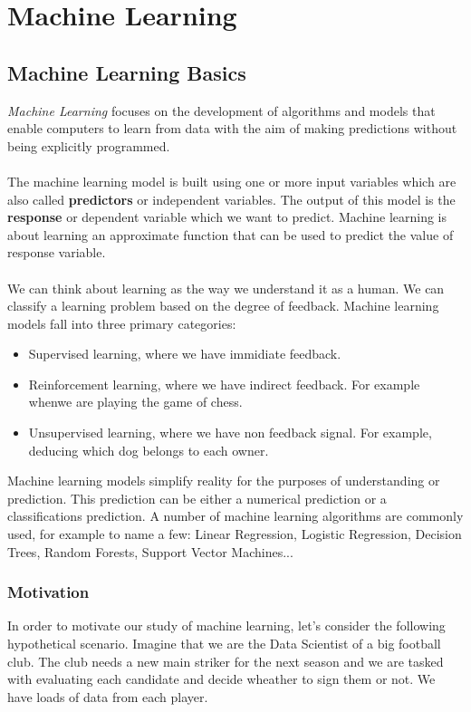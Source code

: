 \documentclass[../main.tex]{subfiles}
\begin{document}
	\chapter{Machine Learning} \label{ch:machine}
	

	\section{Machine Learning Basics}
	\noindent 
	
	\noindent  \textit{Machine Learning} focuses on the development of algorithms and models that enable computers to learn from data with the aim of making predictions without being explicitly programmed. \\ \\ 
	The machine learning model is built using one or more input variables which are also called \textbf{predictors} or independent variables. The output of this model is the \textbf{response} or dependent variable which we want to predict. Machine learning is about learning an approximate function that can be used to predict the value of response variable.\\ \\
	We can think about learning as the way we understand it as a human. We can classify a learning problem based on the degree of feedback. Machine learning models fall into three primary categories:
	\begin{itemize}
		\item Supervised learning, where we have immidiate feedback.
		\item Reinforcement learning, where we have indirect feedback. For example whenwe are playing the game of chess.
		\item Unsupervised learning, where we have non feedback signal. For example, deducing which dog belongs to each owner.
	\end{itemize}
	Machine learning models simplify reality for the purposes of understanding or prediction. This prediction can be either a numerical prediction or a classifications prediction. A number of machine learning algorithms are commonly used, for example to name a few: Linear Regression, Logistic Regression, Decision Trees, Random Forests, Support Vector Machines...
	
	
	\subsection{Motivation }
	\noindent In order to motivate our study of machine learning, let's consider the following hypothetical scenario.  Imagine that we are the Data Scientist of a big football club. The club needs a new main striker for the next season and we are tasked with evaluating each candidate and decide wheather to sign them or not. We have loads of data from each player. \\ 
	
\end{document}
